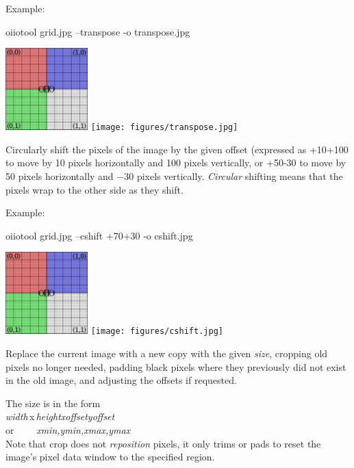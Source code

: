 \noindent Example:
\begin{code}
    oiiotool grid.jpg --transpose -o transpose.jpg
\end{code}
\spc \includegraphics[width=1.25in]{figures/grid-small.jpg} 
\raisebox{40pt}{\large $\rightarrow$}
\texttt{[image: figures/transpose.jpg]} \\
\apiend

Circularly shift the pixels of the image by the given offset (expressed
as {\cf +10+100} to move by 10 pixels horizontally and 100 pixels
vertically, or {\cf +50-30} to move by 50 pixels horizontally and
$-30$ pixels vertically.  \emph{Circular} shifting means that the
pixels wrap to the other side as they shift.

\noindent Example:
\begin{code}
    oiiotool grid.jpg --cshift +70+30 -o cshift.jpg
\end{code}
\spc \includegraphics[width=1.25in]{figures/grid-small.jpg} 
\raisebox{40pt}{\large $\rightarrow$}
\texttt{[image: figures/cshift.jpg]} \\
\apiend

Replace the current image with a new copy with the given \emph{size},
cropping old pixels no longer needed, padding black pixels where they
previously did not exist in the old image, and adjusting the offsets
if requested.

The size is in the form 
\\ \spc\spc \emph{width}\,{\cf x}\,\emph{height}{\cf [+-]}\emph{xoffset}{\cf
  [+-]}\emph{yoffset}
\\ or~~~~ \spc \emph{xmin,ymin,xmax,ymax} \\


Note that {\cf crop} does not \emph{reposition} pixels, it only trims or
pads to reset the image's pixel data window to the specified region.

